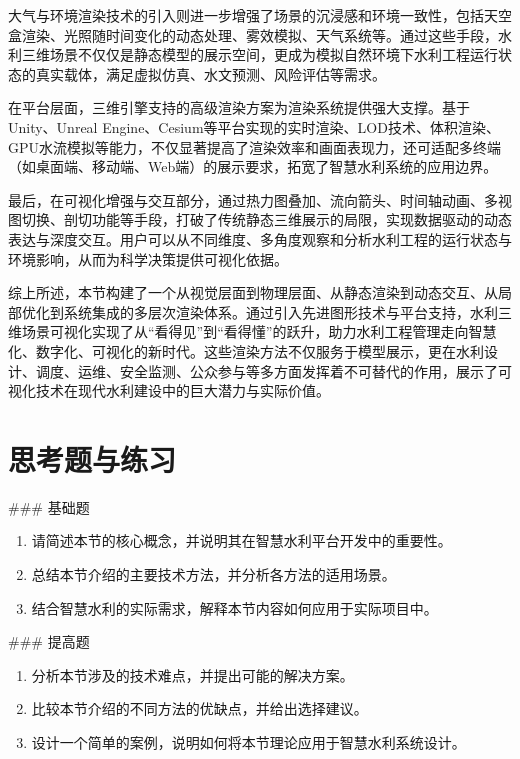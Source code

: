大气与环境渲染技术的引入则进一步增强了场景的沉浸感和环境一致性，包括天空盒渲染、光照随时间变化的动态处理、雾效模拟、天气系统等。通过这些手段，水利三维场景不仅仅是静态模型的展示空间，更成为模拟自然环境下水利工程运行状态的真实载体，满足虚拟仿真、水文预测、风险评估等需求。

在平台层面，三维引擎支持的高级渲染方案为渲染系统提供强大支撑。基于Unity、Unreal Engine、Cesium等平台实现的实时渲染、LOD技术、体积渲染、GPU水流模拟等能力，不仅显著提高了渲染效率和画面表现力，还可适配多终端（如桌面端、移动端、Web端）的展示要求，拓宽了智慧水利系统的应用边界。

最后，在可视化增强与交互部分，通过热力图叠加、流向箭头、时间轴动画、多视图切换、剖切功能等手段，打破了传统静态三维展示的局限，实现数据驱动的动态表达与深度交互。用户可以从不同维度、多角度观察和分析水利工程的运行状态与环境影响，从而为科学决策提供可视化依据。

综上所述，本节构建了一个从视觉层面到物理层面、从静态渲染到动态交互、从局部优化到系统集成的多层次渲染体系。通过引入先进图形技术与平台支持，水利三维场景可视化实现了从``看得见''到``看得懂''的跃升，助力水利工程管理走向智慧化、数字化、可视化的新时代。这些渲染方法不仅服务于模型展示，更在水利设计、调度、运维、安全监测、公众参与等多方面发挥着不可替代的作用，展示了可视化技术在现代水利建设中的巨大潜力与实际价值。

\section{思考题与练习}

\#\#\# 基础题

\begin{enumerate}
\def\labelenumi{\arabic{enumi}.}
\tightlist
\item
  请简述本节的核心概念，并说明其在智慧水利平台开发中的重要性。
\item
  总结本节介绍的主要技术方法，并分析各方法的适用场景。
\item
  结合智慧水利的实际需求，解释本节内容如何应用于实际项目中。
\end{enumerate}

\#\#\# 提高题

\begin{enumerate}
\def\labelenumi{\arabic{enumi}.}
\setcounter{enumi}{3}
\tightlist
\item
  分析本节涉及的技术难点，并提出可能的解决方案。
\item
  比较本节介绍的不同方法的优缺点，并给出选择建议。
\item
  设计一个简单的案例，说明如何将本节理论应用于智慧水利系统设计。
\end{enumerate}

